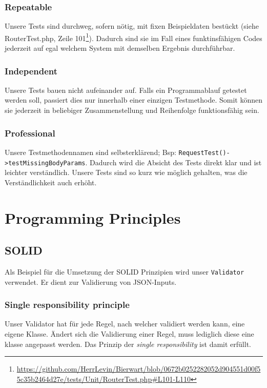 \documentclass[12pt,a4paper,titlepage,ngerman,pdftex]{report}
\begin{document}
    \subsubsection{Repeatable}
    Unsere Tests sind durchweg, sofern nötig, mit fixen Beispieldaten bestückt (siehe RouterTest.php, Zeile 101\footnote{\url{https://github.com/HerrLevin/Bierwart/blob/0672b0252282052d904551d00f55c35b2464d27e/tests/Unit/RouterTest.php#L101-L110}}).
    Dadurch sind sie im Fall eines funktinsfähigen Codes jederzeit auf egal welchem System mit demselben Ergebnis durchführbar.

    \subsubsection{Independent}
    Unsere Tests bauen nicht aufeinander auf.
    Falls ein Programmablauf getestet werden soll, passiert dies nur innerhalb einer einzigen Testmethode.
    Somit können sie jederzeit in beliebiger Zusammenstellung und Reihenfolge funktionsfähig sein.

    \subsubsection{Professional}
    Unsere Testmethodennamen sind selbsterklärend; Bsp: \verb|RequestTest()->testMissingBodyParams|.
    Dadurch wird die Absicht des Tests direkt klar und ist leichter verständlich.
    Unsere Tests sind so kurz wie möglich gehalten, was die Verständlichkeit auch erhöht.

    \section{Programming Principles}
    \label{sec:programmingprinciples}

    \subsection{SOLID}
    \label{subsec:solid}
    Als Beispiel für die Umsetzung der SOLID Prinzipien wird unser \verb|Validator| verwendet. Er dient zur Validierung von JSON-Inputs.
    
    \subsubsection{Single responsibility principle}
    Unser Validator hat für jede Regel, nach welcher validiert werden kann, eine eigene Klasse. Ändert sich die Validierung einer Regel, muss lediglich diese eine klasse angepasst werden. Das Prinzip der \textit{single responsibility} ist damit erfüllt.
\end{document}

